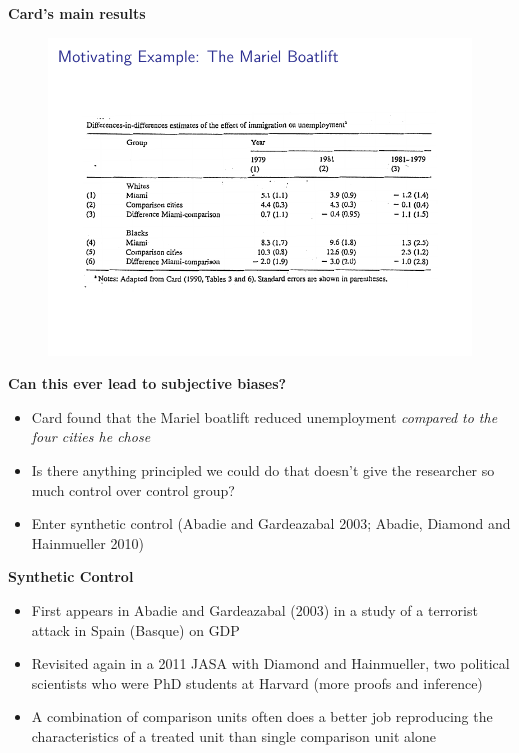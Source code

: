 \documentclass[notes=show]{beamer}
\begin{document}
\begin{frame}[plain]
	\begin{center}
	\textbf{Card's main results}
	\end{center}
	
	\begin{figure}
	\includegraphics[scale=0.75]{./lecture_includes/abadie_2.pdf}
	\end{figure}
\end{frame}

\begin{frame}[plain]
\begin{center}
\textbf{Can this ever lead to subjective biases?}
\end{center}

\begin{itemize}
\item Card found that the Mariel boatlift reduced unemployment \emph{compared to the four cities he chose}
\item Is there anything principled we could do that doesn't give the researcher so much control over control group?
\item Enter synthetic control (Abadie and Gardeazabal 2003; Abadie, Diamond and Hainmueller 2010) 
\end{itemize}
\end{frame}


\begin{frame}[plain]
	\begin{center}
	\textbf{Synthetic Control}
	\end{center}
	
	\begin{itemize}
	\item First appears in Abadie and Gardeazabal (2003) in a study of a terrorist attack in Spain (Basque) on GDP
	\item Revisited again in a 2011 JASA with Diamond and Hainmueller, two political scientists who were PhD students at Harvard (more proofs and inference)
	\item A combination of comparison units often does a better job reproducing the characteristics of a treated unit than single comparison unit alone
	\end{itemize}
\end{frame}
\end{document}
